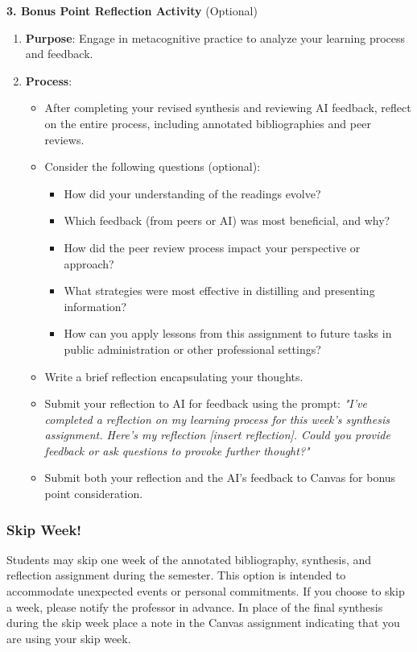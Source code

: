 \documentclass[12pt, letterpaper]{article}
\begin{document}
\textbf{3. Bonus Point Reflection Activity} (Optional)

\begin{enumerate}
    \item \textbf{Purpose}: Engage in metacognitive practice to analyze your learning process and feedback.
    \item \textbf{Process}:
    \begin{itemize}
        \item After completing your revised synthesis and reviewing AI feedback, reflect on the entire process, including annotated bibliographies and peer reviews.
        \item Consider the following questions (optional):
        \begin{itemize}
            \item How did your understanding of the readings evolve?
            \item Which feedback (from peers or AI) was most beneficial, and why?
            \item How did the peer review process impact your perspective or approach?
            \item What strategies were most effective in distilling and presenting information?
            \item How can you apply lessons from this assignment to future tasks in public administration or other professional settings?
        \end{itemize}
        \item Write a brief reflection encapsulating your thoughts.
        \item Submit your reflection to AI for feedback using the prompt:
        \textit{"I've completed a reflection on my learning process for this week's synthesis assignment. Here's my reflection [insert reflection]. Could you provide feedback or ask questions to provoke further thought?"}
        \item Submit both your reflection and the AI's feedback to Canvas for bonus point consideration.
    \end{itemize}
\end{enumerate}

\subsubsection*{Skip Week!}

Students may skip one week of the annotated bibliography, synthesis, and reflection assignment during the semester. This option is intended to accommodate unexpected events or personal commitments. If you choose to skip a week, please notify the professor in advance. In place of the final synthesis during the skip week place a note in the Canvas assignment indicating that you are using your skip week.
\end{document}
